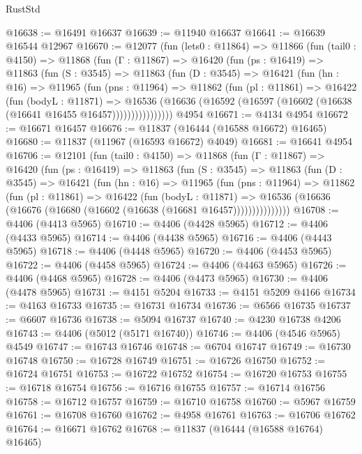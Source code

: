 \begin{lexlean}{RustStd}
\begin{coremodule}
{\begin{coremodule}
{{{{{{{{{{{{{{{{{{{{{{{{{{{{{{{{{{{{{{{{{{{{{{{{{{@16638 := @16491 @16637
@16639 := @11940 @16637
@16641 := @16639 @16544 @12967
@16670 := @12077
    (fun (lets0 : @11864) =>
    @11866
      (fun (tail0 : @4150) =>
      @11868
        (fun (Γ : @11867) =>
        @16420
          (fun (ps : @16419) =>
          @11863
            (fun (S : @3545) =>
            @11863
              (fun (D : @3545) =>
              @16421
                (fun (hn : @16) =>
                @11965
                  (fun (pns : @11964) =>
                  @11862
                    (fun (pl : @11861) =>
                    @16422
                      (fun (bodyL : @11871) =>
                      @16536
                        (@16636
                          (@16592 (@16597 (@16602 (@16638 (@16641 @16455 @16457))))))))))))))))
    @4954
@16671 := @4134 @4954
@16672 := @16671 @16457
@16676 := @11837 (@16444 (@16588 @16672) @16465)
@16680 := @11837 (@11967 (@16593 @16672) @4049)
@16681 := @16641 @4954
@16706 := @12101
    (fun (tail0 : @4150) =>
    @11868
      (fun (Γ : @11867) =>
      @16420
        (fun (ps : @16419) =>
        @11863
          (fun (S : @3545) =>
          @11863
            (fun (D : @3545) =>
            @16421
              (fun (hn : @16) =>
              @11965
                (fun (pns : @11964) =>
                @11862
                  (fun (pl : @11861) =>
                  @16422
                    (fun (bodyL : @11871) =>
                    @16536 (@16636 (@16676 (@16680 (@16602 (@16638 (@16681 @16457)))))))))))))))
@16708 := @4406 (@4413 @5965)
@16710 := @4406 (@4428 @5965)
@16712 := @4406 (@4433 @5965)
@16714 := @4406 (@4438 @5965)
@16716 := @4406 (@4443 @5965)
@16718 := @4406 (@4448 @5965)
@16720 := @4406 (@4453 @5965)
@16722 := @4406 (@4458 @5965)
@16724 := @4406 (@4463 @5965)
@16726 := @4406 (@4468 @5965)
@16728 := @4406 (@4473 @5965)
@16730 := @4406 (@4478 @5965)
@16731 := @4151 @5204
@16733 := @4151 @5209 @4166
@16734 := @4163 @16733
@16735 := @16731 @16734
@16736 := @6566 @16735
@16737 := @6607 @16736
@16738 := @5094 @16737
@16740 := @4230 @16738 @4206
@16743 := @4406 (@5012 (@5171 @16740))
@16746 := @4406 (@4546 @5965) @4549
@16747 := @16743 @16746
@16748 := @6704 @16747
@16749 := @16730 @16748
@16750 := @16728 @16749
@16751 := @16726 @16750
@16752 := @16724 @16751
@16753 := @16722 @16752
@16754 := @16720 @16753
@16755 := @16718 @16754
@16756 := @16716 @16755
@16757 := @16714 @16756
@16758 := @16712 @16757
@16759 := @16710 @16758
@16760 := @5967 @16759
@16761 := @16708 @16760
@16762 := @4958 @16761
@16763 := @16706 @16762
@16764 := @16671 @16762
@16768 := @11837 (@16444 (@16588 @16764) @16465)
}}}}}}}}}}}}}}}}}}}}}}}}}}}}}}}}}}}}}}}}}}}}}}}}}}
\end{coremodule}}
\end{coremodule}
\end{lexlean}
